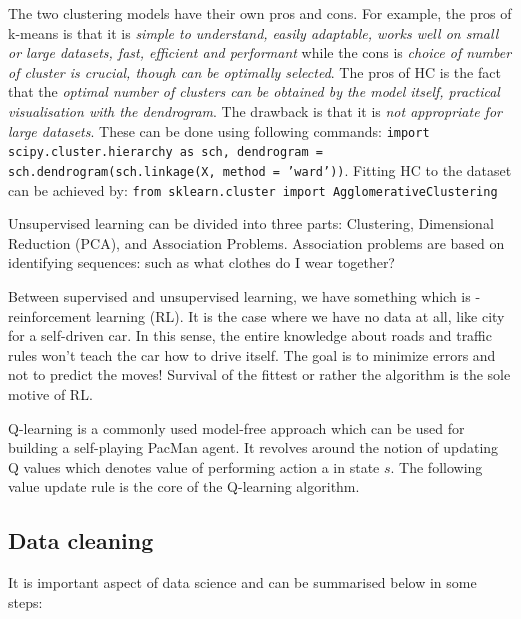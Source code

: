 \documentclass[11pt]{article}
\begin{document}
The two clustering models have their own pros and cons. For example, the pros of k-means is that it is \emph{simple to understand, easily adaptable, works well on small or large datasets, fast, efficient and performant}
while the cons is \emph{choice of number of cluster is crucial, though can be optimally selected}.
The pros of HC is the fact that the \emph{optimal number of clusters can be obtained by the 
model itself, practical visualisation with the dendrogram}. The drawback is that it is \emph{not appropriate for large datasets}. 
These can be done using following commands: \texttt{import scipy.cluster.hierarchy as sch, dendrogram = sch.dendrogram(sch.linkage(X, method = 'ward'))}. 
Fitting HC to the dataset can be achieved by: \texttt{from sklearn.cluster import AgglomerativeClustering}



Unsupervised learning can be divided into three parts: Clustering, Dimensional Reduction (PCA), and Association Problems. 
Association problems are based on identifying sequences: such as what clothes do I wear together?


Between supervised and unsupervised learning, we have something which is - reinforcement learning (RL). 
It is the case where we have no data at all, like city for a self-driven car. In this sense, the entire
knowledge about roads and traffic rules won't teach the car how to drive itself. The goal is to minimize errors
and not to predict the moves! Survival of the fittest or rather the algorithm is the sole motive of RL. 

Q-learning is a commonly used model-free approach which can be used for building a self-playing PacMan agent. 
It revolves around the notion of updating Q values which denotes value of performing action a in state $s$. 
The following value update rule is the core of the Q-learning algorithm.



\subsection{Data cleaning}

It is important aspect of data science and can be summarised below in some steps:
\end{document}

